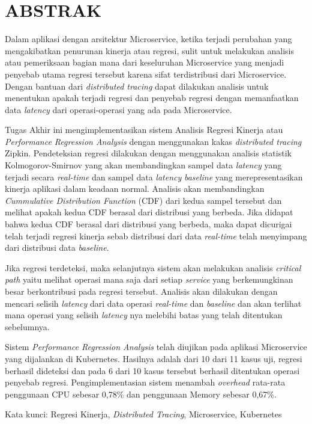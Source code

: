 \clearpage
\chapter*{ABSTRAK}

Dalam aplikasi dengan arsitektur Microservice, ketika terjadi perubahan yang mengakibatkan penurunan kinerja atau regresi, sulit untuk melakukan analisis atau pemeriksaan bagian mana dari keseluruhan Microservice yang menjadi penyebab utama regresi tersebut karena sifat terdistribusi dari Microservice. Dengan bantuan dari \textit{distributed tracing} dapat dilakukan analisis untuk menentukan apakah terjadi regresi dan penyebab regresi dengan memanfaatkan data \textit{latency} dari operasi-operasi yang ada pada Microservice.

Tugas Akhir ini mengimplementasikan sistem Analisis Regresi Kinerja atau \textit{Performance Regression Analysis} dengan menggunakan kakas \textit{distributed tracing} Zipkin. Pendeteksian regresi dilakukan dengan menggunakan analisis statistik Kolmogorov-Smirnov yang akan membandingkan sampel data \textit{latency} yang terjadi secara \textit{real-time} dan sampel data \textit{latency} \textit{baseline} yang merepresentasikan kinerja aplikasi dalam keadaan normal. Analisis akan membandingkan \textit{Cummulative Distribution Function} (CDF) dari kedua sampel tersebut dan melihat apakah kedua CDF berasal dari distribusi yang berbeda. Jika didapat bahwa kedua CDF berasal dari distribusi yang berbeda, maka dapat dicurigai telah terjadi regresi kinerja sebab distribusi dari data \textit{real-time} telah menyimpang dari distribusi data \textit{baseline}.

Jika regresi terdeteksi, maka selanjutnya sistem akan melakukan analisis \textit{critical path} yaitu melihat operasi mana saja dari setiap \textit{service} yang berkemungkinan besar berkontribusi pada regresi tersebut. Analisis akan dilakukan dengan mencari selisih \textit{latency} dari data operasi \textit{real-time} dan \textit{baseline} dan akan terlihat mana operasi yang selisih \textit{latency} nya melebihi batas yang telah ditentukan sebelumnya.

Sistem \textit{Performance Regression Analysis} telah diujikan pada aplikasi Microservice yang dijalankan di Kubernetes. Hasilnya adalah dari 10 dari 11 kasus uji, regresi berhasil dideteksi dan pada 6 dari 10 kasus tersebut berhasil ditentukan operasi penyebab regresi. Pengimplementasian sistem menambah \textit{overhead} rata-rata penggunaan CPU sebesar 0,78\% dan penggunaan Memory sebesar 0,67\%.



\vspace{10mm}
Kata kunci: Regresi Kinerja, \textit{Distributed Tracing}, Microservice, Kubernetes
\clearpage